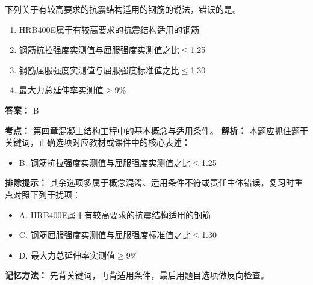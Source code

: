 \documentclass[UTF8,fontset=fandol,11pt]{ctexart}
\begin{document}
\begin{quizbox}[title={第 3 题}]
下列关于有较高要求的抗震结构适用的钢筋的说法，错误的是。\\
\begin{enumerate}[label=\Alph*.]
\item HRB400E属于有较高要求的抗震结构适用的钢筋
\item 钢筋抗拉强度实测值与屈服强度实测值之比$\leq$1.25
\item 钢筋屈服强度实测值与屈服强度标准值之比$\leq$1.30
\item 最大力总延伸率实测值$\geq$9\%
\end{enumerate}
\textbf{答案：} B
\vspace{0.25em}
\begin{answerbox}[title={考点解析}]
\textbf{考点：} 第四章混凝土结构工程中的基本概念与适用条件。
\textbf{解析：} 本题应抓住题干关键词，正确选项对应教材或课件中的核心表述：
\begin{itemize}
\item B. 钢筋抗拉强度实测值与屈服强度实测值之比$\leq$1.25
\end{itemize}
\textbf{排除提示：} 其余选项多属于概念混淆、适用条件不符或责任主体错误，复习时重点对照下列干扰项：
\begin{itemize}
\item A. HRB400E属于有较高要求的抗震结构适用的钢筋
\item C. 钢筋屈服强度实测值与屈服强度标准值之比$\leq$1.30
\item D. 最大力总延伸率实测值$\geq$9\%
\end{itemize}
\textbf{记忆方法：} 先背关键词，再背适用条件，最后用题目选项做反向检查。
\end{answerbox}
\end{quizbox}
\end{document}
